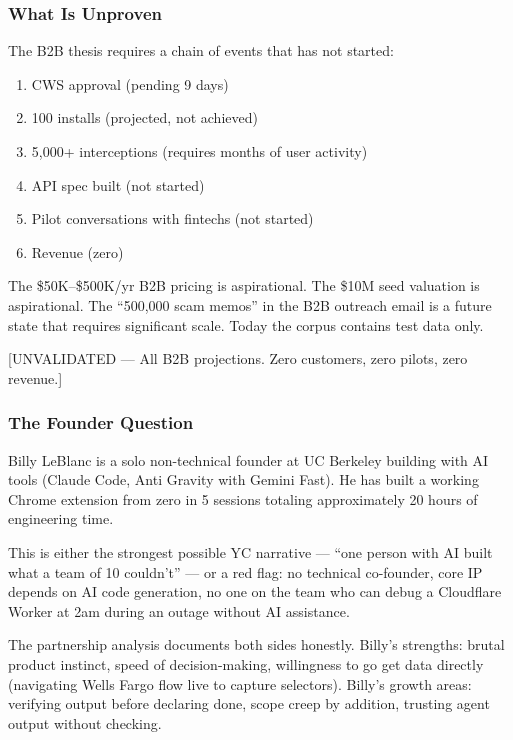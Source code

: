 \documentclass[11pt, letterpaper]{article}
\newcommand{\unvalidated}[1]{\textcolor{unvalidated}{[UNVALIDATED --- #1]}}
\begin{document}
  \subsubsection{What Is Unproven}

  The B2B thesis requires a chain of events that has not started:
  \begin{enumerate}[nosep]
    \item CWS approval (pending 9 days)
    \item 100 installs (projected, not achieved)
    \item 5,000+ interceptions (requires months of user activity)
    \item API spec built (not started)
    \item Pilot conversations with fintechs (not started)
    \item Revenue (zero)
  \end{enumerate}

  The \$50K--\$500K/yr B2B pricing is aspirational. The \$10M seed valuation is aspirational. The ``500,000 scam memos'' in the B2B outreach email is a future state that requires significant scale. Today the corpus contains test data only.

  \unvalidated{All B2B projections. Zero customers, zero pilots, zero revenue.}

  \subsubsection{The Founder Question}

  Billy LeBlanc is a solo non-technical founder at UC Berkeley building with AI tools (Claude Code, Anti Gravity with Gemini Fast). He has built a working Chrome extension from zero in 5 sessions totaling approximately 20 hours of engineering time.

  This is either the strongest possible YC narrative --- ``one person with AI built what a team of 10 couldn't'' --- or a red flag: no technical co-founder, core IP depends on AI code generation, no one on the team who can debug a Cloudflare Worker at 2am during an outage without AI assistance.

  The partnership analysis documents both sides honestly. Billy's strengths: brutal product instinct, speed of decision-making, willingness to go get data directly (navigating Wells Fargo flow live to capture selectors). Billy's growth areas: verifying output before declaring done, scope creep by addition, trusting agent output without checking.
\end{document}
